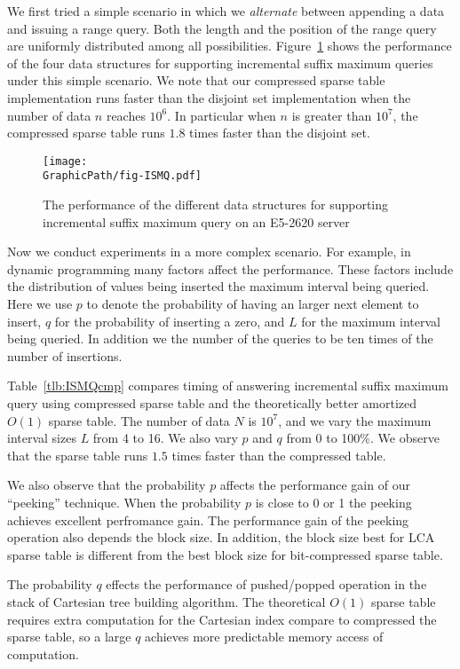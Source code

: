 We first tried a simple scenario in which we {\em alternate} between
appending a data and issuing a range query.  Both the length and the
position of the range query are uniformly distributed among all
possibilities.  Figure~\ref{fig:fig-ISMQcmp} shows the performance of
the four data structures for supporting incremental suffix maximum
queries under this simple scenario.  We note that our compressed
sparse table implementation runs faster than the disjoint set
implementation when the number of data $n$ reaches $10^6$.  In
particular when $n$ is greater than $10^7$, the compressed sparse
table runs $1.8$ times faster than the disjoint set.

\begin{figure}[!thb]
  \centering
  \texttt{[image: \\GraphicPath/fig-ISMQ.pdf]}
  \caption{The performance of the different data structures for
    supporting incremental suffix maximum query on an E5-2620 server}
  \label{fig:fig-ISMQcmp}
\end{figure}

Now we conduct experiments in a more complex scenario.  For example,
in dynamic programming many factors affect the performance. These
factors include the distribution of values being inserted the maximum
interval being queried.  Here we use $p$ to denote the probability of
having an larger next element to insert, $q$ for the probability of
inserting a zero, and $L$ for the maximum interval being queried.  In
addition we the number of the queries to be ten times of the number of
insertions.



Table~\ref{tlb:ISMQcmp} compares timing of answering incremental
suffix maximum query using compressed sparse table and the
theoretically better amortized $O(1)$ sparse table.  The number of
data $N$ is $10^7$, and we vary the maximum interval sizes $L$ from 4
to 16.  We also vary $p$ and $q$ from 0 to 100\%.  We observe that the
sparse table runs $1.5$ times faster than the compressed table.

We also observe that the probability $p$ affects the performance gain
of our ``peeking'' technique.  When the probability $p$ is close to 0
or 1 the peeking achieves excellent perfromance gain.  The performance
gain of the peeking operation also depends the block size.  In
addition, the block size best for LCA sparse table is different from
the best block size for bit-compressed sparse table.

The probability $q$ effects the performance of pushed/popped operation
in the stack of Cartesian tree building algorithm.  The theoretical
$O(1)$ sparse table requires extra computation for the Cartesian index
compare to compressed the sparse table, so a large $q$ achieves more
predictable memory access of computation. %

